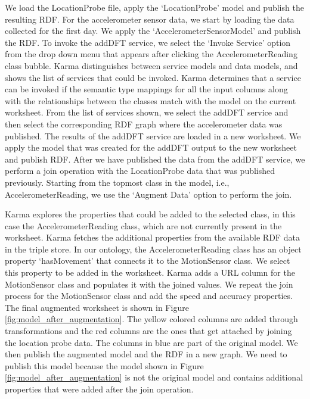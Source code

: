 We load the LocationProbe file, apply the `LocationProbe' model and publish the resulting RDF. For the accelerometer sensor data, we start by loading the data collected for the first day. We apply the `AccelerometerSensorModel' and publish the RDF. To invoke the addDFT service, we select the `Invoke Service' option from the drop down menu that appears after clicking the AccelerometerReading class bubble. Karma distinguishes between service models and data models, and shows the list of services that could be invoked. Karma determines that a service can be invoked if the semantic type mappings for all the input columns along with the relationships between the classes match with the model on the current worksheet. From the list of services shown, we select the addDFT service and then select the corresponding RDF graph where the accelerometer data was published. The results of the addDFT service are loaded in a new worksheet. We apply the model that was created for the addDFT output to the new worksheet and publish RDF. After we have published the data from the addDFT service, we perform a join operation with the LocationProbe data that was published previously. Starting from the topmost class in the model, i.e., AccelerometerReading, we use the `Augment Data' option to perform the join.

Karma explores the properties that could be added to the selected class, in this case the AccelerometerReading class, which are not currently present in the worksheet. Karma fetches the additional properties from the available RDF data in the triple store. In our ontology, the AccelerometerReading class has an object property `hasMovement' that connects it to the MotionSensor class. We select this property to be added in the worksheet. Karma adds a URL column for the MotionSensor class and populates it with the joined values. We repeat the join process for the MotionSensor class and add the speed and accuracy properties. The final augmented worksheet is shown in Figure \ref{fig:model_after_augmentation}. The yellow colored columns are added through transformations and the red columns are the ones that get attached by joining the location probe data. The columns in blue are part of the original model. We then publish the augmented model and the RDF in a new graph. We need to publish this model because the model shown in Figure \ref{fig:model_after_augmentation} is not the original model and contains additional properties that were added after the join operation. 

